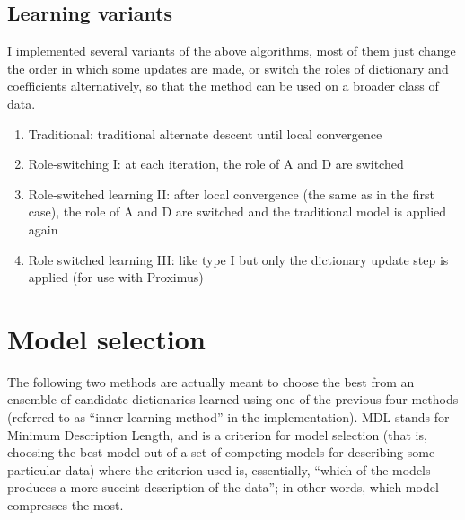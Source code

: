 \documentclass[a4paper]{IEEEtran}
\begin{document}
\subsection{Learning variants}

I implemented several variants of the above algorithms, most of them just change the order in which some updates are made, or switch the roles of dictionary and coefficients alternatively, so that the method can be used on a broader class of data.
 

\begin{enumerate}
\item Traditional: traditional alternate descent until local convergence
\item Role-switching I: at each iteration, the role of A and D are switched
\item Role-switched learning II: after local convergence (the same as in the first case), the role of A and D are switched and the traditional model is applied again
\item Role switched learning III: like type I but only the dictionary update step is applied (for use with Proximus)
\end{enumerate}

\section{Model selection}

The following two methods are actually meant to choose the best from an ensemble of candidate dictionaries learned using one of the previous four methods (referred to as ``inner learning method'' in the implementation). MDL stands for Minimum Description Length, and is a criterion for model selection (that is, choosing the best model out of a set of competing models for describing some particular data) where the criterion used is, essentially, ``which of the models produces a more succint description of the data''; in other words, which model compresses the most.
 
\end{document}
